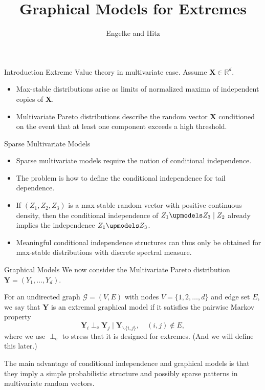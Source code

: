 \documentclass[11pt]{beamer}
\author{Engelke and Hitz}
\title{Graphical Models for Extremes}
\newcommand{\bX}{\boldsymbol{X}}
\newcommand{\bY}{\boldsymbol{Y}}
\begin{document}
\begin{frame}
\titlepage
\end{frame}


\begin{frame}{Introduction}
Extreme Value theory in multivariate case. Assume $\bX\in \mathbb{R}^d$.
\begin{itemize}
\item Max-stable distributions arise as limits of normalized maxima of independent copies of $\bX$.
\item Multivariate Pareto distributions describe the random vector
$\bX$ conditioned on the event that at least one component exceeds a high threshold.
\end{itemize}
\end{frame}

\begin{frame}{Sparse Multivariate Models}
\begin{itemize}
\item Sparse multivariate
models require the notion of conditional independence.
\item The problem is how to define the conditional independence for tail dependence.
\item If $(Z_1,Z_2,Z_3)$ is a max-stable random vector with positive continuous density, then the conditional independence of $Z_{1} \upmodels Z_{3} \mid Z_{2}$ already implies the independence $Z_{1} \upmodels Z_{3}$.
\item Meaningful conditional independence structures can thus only be obtained
for max-stable distributions with discrete spectral measure.

\end{itemize}
\end{frame}

\begin{frame}{Graphical Models}
We now consider the Multivariate Pareto distribution $\bY=(Y_1,\dots,Y_d)$.

\vspace{3ex}

For an undirected graph $\mathcal{G}=(V, E)$ with nodes $V=\{1,2,\dots,d\}$ and edge set $E$, we say that $\bY$ is an extremal graphical model if it satisfies the pairwise Markov property
$$
\bY_{i} \perp_{\mathrm{e}} \bY_{j} \mid \bY_{\backslash\{i, j\}}, \quad(i, j) \notin E,
$$
where we use $\perp_{\mathrm{e}}$ to stress that it is designed for extremes. (And we will define this later.)

\vspace{3ex}

The main advantage of conditional independence and graphical models is that they imply a
simple probabilistic structure and possibly sparse patterns in multivariate random vectors.
\end{frame}
\end{document}
